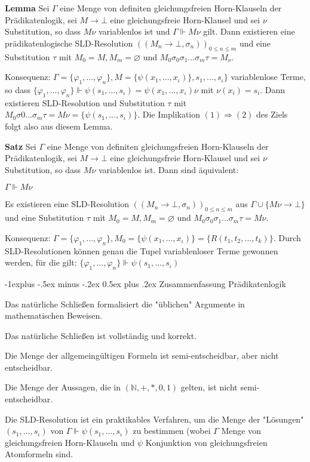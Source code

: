 \documentclass[a4paper]{article}
\makeatletter
\renewcommand{\note}[2]{\begin{noteBox} \textbf{#1} #2 \end{noteBox}}
\renewcommand{\subsection}{\@startsection{subsection}{2}{0mm}%
                {-1explus -.5ex minus -.2ex}%
                {0.5ex plus .2ex}%
                {\normalfont\normalsize\bfseries}}
\makeatother
\begin{document}
\begin{multicols}{3}
  \note{Lemma}{Sei $\Gamma$ eine Menge von definiten gleichungsfreien Horn-Klauseln der Prädikatenlogik, sei $M\rightarrow\bot$ eine gleichungsfreie Horn-Klausel und sei $\nu$ Substitution, so dass $M\nu$ variablenlos ist und $\Gamma\Vdash M\nu$ gilt. Dann existieren eine prädikatenlogische SLD-Resolution $((M_n \rightarrow\bot,\sigma_n))_{0 \leq n\leq m}$ und eine Substitution $\tau$ mit $M_0=M,M_m=\varnothing$ und $M_0 \sigma_0 \sigma_1... \sigma_m \tau=M_{\nu}$.}

  Konsequenz:
  $\Gamma=\{\varphi_1,...,\varphi_n\},M=\{\psi(x_1 ,...,x_{\iota})\},s_1,...,s_\iota\}$ variablenlose Terme, so dass $\{\varphi_1 ,...,\varphi_n\}\Vdash\psi(s_1,...,s_{\iota}) =\psi(x_1 ,...,x_{\iota})\nu$ mit $\nu(x_i)=s_i$. Dann existieren SLD-Resolution und Substitution $\tau$ mit $M_0\sigma 0...\sigma_m\tau=M\nu=\{\psi (s_1,...,s_{\iota} )\}$.
  Die Implikation $(1)\Rightarrow (2)$ des Ziels folgt also aus diesem Lemma.

  \note{Satz}{Sei $\Gamma$ eine Menge von definiten gleichungsfreien Horn-Klauseln der Prädikatenlogik, sei $M\rightarrow\bot$ eine gleichungsfreie Horn-Klausel und sei $\nu$ Substitution, so dass $M\nu$ variablenlos ist. Dann sind äquivalent:
    \begin{itemize*}
      \item $\Gamma\Vdash M\nu$
      \item Es existieren eine SLD-Resolution $((M_n\rightarrow\bot,\sigma_n))_{0\leq n\leq m}$ aus $\Gamma\cup\{M\nu\rightarrow\bot\}$ und eine Substitution $\tau$ mit $M_0=M,M_m=\varnothing$ und $M_0\sigma_0\sigma_1...\sigma_m\tau=M\nu$.
    \end{itemize*}
  }

  Konsequenz:
  $\Gamma =\{\varphi_1,...,\varphi_n\},M_0 =\{\psi(x_1,...,x_{\iota})\}=\{R(t_1,t_2,...,t_k)\}$. Durch SLD-Resolutionen können genau die Tupel variablenloser Terme gewonnen werden, für die gilt:
  $\{\varphi_1,...,\varphi_n\}\Vdash\psi (s_1,...,s_{\iota})$

  \subsection{Zusammenfassung Prädikatenlogik}
  \begin{itemize*}
    \item Das natürliche Schließen formalisiert die "üblichen" Argumente in     mathematischen Beweisen.
    \item Das natürliche Schließen ist vollständig und korrekt.
    \item Die Menge der allgemeingültigen Formeln ist semi-entscheidbar, aber nicht entscheidbar.
    \item Die Menge der Aussagen, die in $(\mathbb{N},+,*,0,1)$ gelten, ist nicht     semi-entscheidbar.
    \item Die SLD-Resolution ist ein praktikables Verfahren, um die Menge der     "Lösungen" $(s_1,...,s_{\iota})$ von $\Gamma\Vdash\psi(s_1,...,s_{\iota})$ zu bestimmen (wobei $\Gamma$ Menge von gleichungsfreien Horn-Klauseln und $\psi$ Konjunktion von gleichungsfreien Atomformeln sind.
  \end{itemize*}


\end{multicols}
\end{document}
